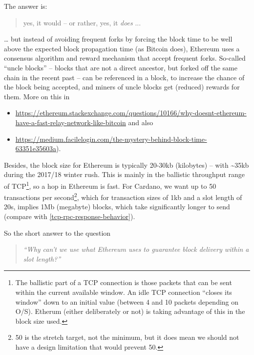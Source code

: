 \documentclass[11pt,a4paper]{article}
\begin{document}
The answer is:

\begin{quote}
yes, it would -- or rather, yes, it \emph{does} ...
\end{quote}

\ldots{} but instead of avoiding frequent forks by forcing the block
time to be well above the expected block propagation time (as Bitcoin
does), Ethereum uses a consensus algorithm and reward mechanism that
accept frequent forks. So-called ``uncle blocks'' -- blocks that are not
a direct ancestor, but forked off the same chain in the recent past --
can be referenced in a block, to increase the chance of the block being
accepted, and miners of uncle blocks get (reduced) rewards for them.
More on this in

\begin{itemize}
\item
  \href{https://ethereum.stackexchange.com/questions/10166/why-doesnt-ethereum-have-a-fast-relay-network-like-bitcoin}{{https://ethereum.stackexchange.com/questions/10166/why-doesnt-ethereum-have-a-fast-relay-network-like-bitcoin}}
  and also
\item
  \href{https://medium.facilelogin.com/the-mystery-behind-block-time-63351e35603a}{{https://medium.facilelogin.com/the-mystery-behind-block-time-63351e35603a}}).
\end{itemize}

Besides, the block size for Ethereum is typically 20-30kb (kilobytes) --
with \textasciitilde{}35kb during the 2017/18 winter rush. This is
mainly in the ballistic throughput range of TCP\footnote{The ballistic
  part of a TCP connection is those packets that can be sent within the
  current available window. An idle TCP connection ``closes its window''
  down to an initial value (between 4 and 10 packets depending on O/S).
  Etherum (either deliberately or not) is taking advantage of this in
  the block size used.}, so a hop in Ethereum is fast. For Cardano, we
want up to 50 transactions per second\footnote{50 is the stretch target,
  not the minimum, but it does mean we should not have a design
  limitation that would prevent 50.}, which for transaction sizes of 1kb
and a slot length of 20s, implies 1Mb (megabyte) blocks, which take
significantly longer to send (compare with \cref{tcp-rpc-response-behavior}).

So the short answer to the question

\begin{quote}
\emph{``Why can't we use what Ethereum uses to guarantee block delivery
within a slot length?'' }
\end{quote}
\end{document}
